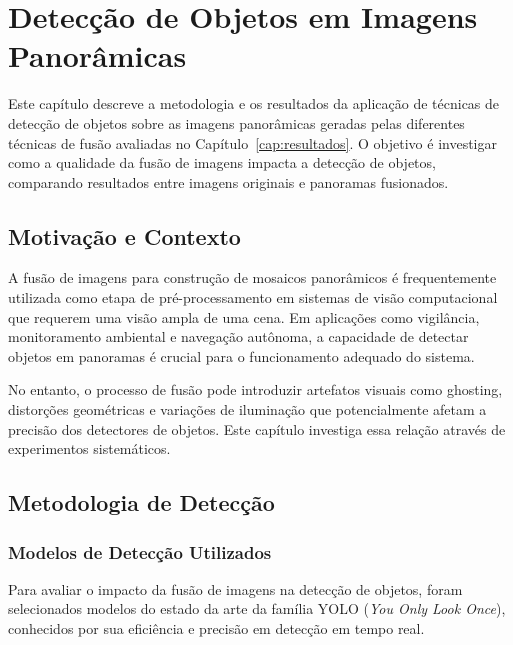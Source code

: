 
\chapter{Detecção de Objetos em Imagens Panorâmicas}\label{cap:deteccao-objetos}

Este capítulo descreve a metodologia e os resultados da aplicação de técnicas de detecção de objetos sobre as imagens panorâmicas geradas pelas diferentes técnicas de fusão avaliadas no Capítulo~\ref{cap:resultados}. O objetivo é investigar como a qualidade da fusão de imagens impacta a detecção de objetos, comparando resultados entre imagens originais e panoramas fusionados.

\section{Motivação e Contexto}

A fusão de imagens para construção de mosaicos panorâmicos é frequentemente utilizada como etapa de pré-processamento em sistemas de visão computacional que requerem uma visão ampla de uma cena. Em aplicações como vigilância, monitoramento ambiental e navegação autônoma, a capacidade de detectar objetos em panoramas é crucial para o funcionamento adequado do sistema.

No entanto, o processo de fusão pode introduzir artefatos visuais como ghosting, distorções geométricas e variações de iluminação que potencialmente afetam a precisão dos detectores de objetos. Este capítulo investiga essa relação através de experimentos sistemáticos.

\section{Metodologia de Detecção}

\subsection{Modelos de Detecção Utilizados}

Para avaliar o impacto da fusão de imagens na detecção de objetos, foram selecionados modelos do estado da arte da família YOLO (\textit{You Only Look Once}), conhecidos por sua eficiência e precisão em detecção em tempo real.

